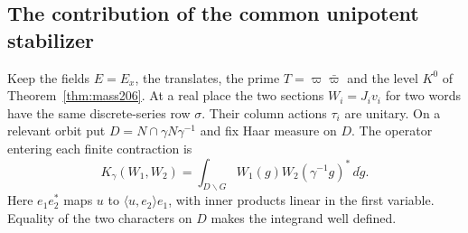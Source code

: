 \documentclass[a4paper,11pt]{article}
\theoremstyle{definition}
\theoremstyle{remark}
\numberwithin{equation}{section}
\begin{document}
\subsection{The contribution of the common unipotent stabilizer}\label{nav:IX-20}
Keep the fields \(E=E_x\), the translates, the prime
\(T=\varpi\bar\varpi\) and the level \(K^0\) of
Theorem~\ref{thm:mass206}. At a real place the two sections
\(W_i=J_i v_i\) for two words have the same discrete-series row
\(\sigma\). Their column actions \(\tau_i\) are unitary. On
a relevant orbit put \(D=N\cap\gamma N\gamma^{-1}\) and fix
Haar measure on \(D\). The operator entering each finite
contraction is
\[
 K_\gamma(W_1,W_2)=
 \int_{D\backslash G}W_1(g)W_2(\gamma^{-1}g)^*\,d\dot g .
\]
Here \(e_1e_2^*\) maps \(u\) to \(\langle u,e_2\rangle e_1\),
with inner products linear in the first variable. Equality of
the two characters on \(D\) makes the integrand well defined.
\end{document}
